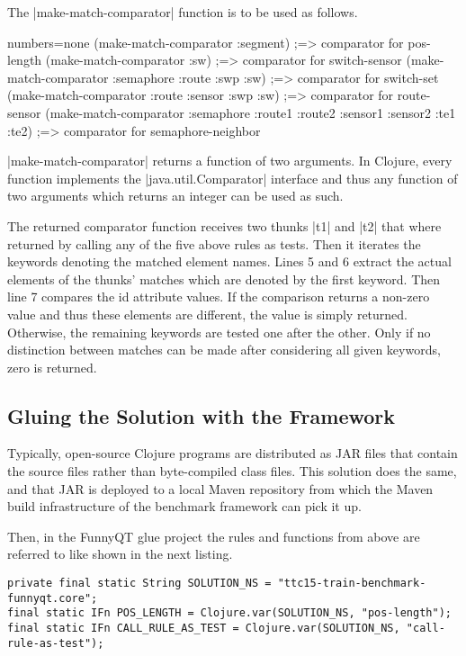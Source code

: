 \documentclass[submission]{eptcs}
\newcommand{\code}{\clojureinline}
\begin{document}
The \code|make-match-comparator| function is to be used as follows.

\begin{clojurecode*}{numbers=none}
(make-match-comparator :segment)
;=> comparator for pos-length
(make-match-comparator :sw)
;=> comparator for switch-sensor
(make-match-comparator :semaphore :route :swp :sw)
;=> comparator for switch-set
(make-match-comparator :route :sensor :swp :sw)
;=> comparator for route-sensor
(make-match-comparator :semaphore :route1 :route2 :sensor1 :sensor2 :te1 :te2)
;=> comparator for semaphore-neighbor
\end{clojurecode*}


\code|make-match-comparator| returns a function of two arguments.  In Clojure,
every function implements the \code|java.util.Comparator| interface and thus
any function of two arguments which returns an integer can be used as such.

The returned comparator function receives two thunks \code|t1| and \code|t2|
that where returned by calling any of the five above rules as tests.  Then it
iterates the keywords denoting the matched element names.  Lines 5 and 6
extract the actual elements of the thunks' matches which are denoted by the
first keyword.  Then line 7 compares the \textsf{id} attribute values.  If the
comparison returns a non-zero value and thus these elements are different, the
value is simply returned.  Otherwise, the remaining keywords are tested one
after the other.  Only if no distinction between matches can be made after
considering all given keywords, zero is returned.



\subsection{Gluing the Solution with the Framework}
\label{sec:gluing}

Typically, open-source Clojure programs are distributed as JAR files that
contain the source files rather than byte-compiled class files.  This solution
does the same, and that JAR is deployed to a local Maven repository from which
the Maven build infrastructure of the benchmark framework can pick it up.

Then, in the FunnyQT glue project the rules and functions from above are
referred to like shown in the next listing.

\begin{verbatim}
private final static String SOLUTION_NS = "ttc15-train-benchmark-funnyqt.core";
final static IFn POS_LENGTH = Clojure.var(SOLUTION_NS, "pos-length");
final static IFn CALL_RULE_AS_TEST = Clojure.var(SOLUTION_NS, "call-rule-as-test");
\end{verbatim}
\end{document}
